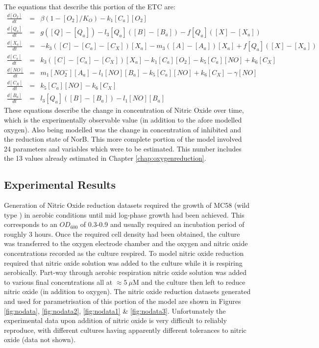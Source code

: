 The equations that describe this portion of the ETC are:
\begin{eqnarray*}
\frac{d[O_2]}{dt} & = & \beta(1-[O_2]/K_O) - k_{1}[C_a][O_2]\\
\frac{d[Q_a]}{dt} & = & g([Q] - [Q_a]) - l_3[Q_a]([B] - [B_a]) - f[Q_a]([X]-[X_a])\\
\frac{d[X_a]}{dt} & = & -k_3([C] - [C_a] - [C_X])[X_a]  - m_3([A] - [A_a])[X_a] + f[Q_a]([X]-[X_a])\\
\frac{d[C_a]}{dt} & = & k_3([C] - [C_a] - [C_X])[X_a] - k_{1}[C_a][O_2] - k_5[C_a][NO] + k_6[C_X]\\
\frac{d[NO]}{dt} & = & m_{1}[NO_2^-][A_a] - l_1[NO][B_a] - k_5[C_a][NO] + k_6 [C_X] - \gamma[NO]\\
\frac{d[C_X]}{dt} & = & k_5[C_a][NO] - k_6 [C_X]\\
\frac{d[B_a]}{dt} & = & l_3[Q_a]([B] - [B_a]) - l_1[NO][B_a]
\end{eqnarray*}
These equations describe the change in concentration of Nitric Oxide over time, which is the experimentally observable value (in addition to the afore modelled oxygen). Also being modelled was the change in concentration of inhibited \cbbthree{} and the reduction state of NorB. This more complete portion of the model involved 24 parameters and variables which were to be estimated. This number includes the 13 values already estimated in Chapter \ref{chap:oxygenreduction}.
\subsection{Experimental Results}
Generation of Nitric Oxide reduction datasets required the growth of MC58 (wild type \Nsm{}) in aerobic conditions until mid log-phase growth had been achieved. This corresponds to an $OD_{600}$ of 0.3-0.9 and usually required an incubation period of roughly 3 hours. Once the required cell density had been obtained, the culture was transferred to the oxygen electrode chamber and the oxygen and nitric oxide concentrations recorded as the culture respired. To model nitric oxide reduction required that nitric oxide solution was added to the culture while it is respiring aerobically. Part-way through aerobic respiration nitric oxide solution was added to various final concentrations all at $\approx 5~\mu$M and the culture then left to reduce nitric oxide (in addition to oxygen). The nitric oxide reduction datasets generated and used for parametrisation of this portion of the model are shown in Figures \ref{fig:nodata}, \ref{fig:nodata2}, \ref{fig:nodata1} \& \ref{fig:nodata3}. Unfortunately the experimental data 
upon addition of nitric oxide is very difficult to reliably reproduce, with different cultures having apparently different tolerances to nitric oxide (data not shown).

